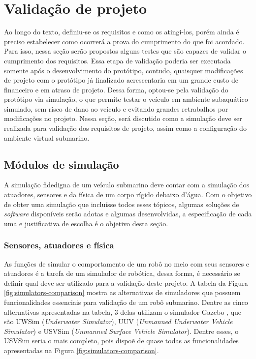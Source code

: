 \section{Validação de projeto}
\label{sec:validacao}

Ao longo do texto, definiu-se os requisitos e como os atingi-los, porém ainda é
preciso estabelecer como ocorrerá a prova do cumprimento do que foi acordado.
Para isso, nessa seção serão propostos alguns testes que são capazes de validar
o cumprimento dos requisitos. Essa etapa de validação poderia ser executada
somente após o desenvolvimento do protótipo, contudo, quaisquer modificações
de projeto com o protótipo já finalizado acrescentaria em um grande custo de
financeiro e em atraso de projeto. Dessa forma, optou-se pela validação do
protótipo via simulação, o que permite testar o veículo em ambiente subaquático
simulado, sem risco de dano ao veículo e evitando grandes retrabalhos por
modificações no projeto. Nessa seção, será discutido como a simulação deve ser
realizada para validação dos requisitos de projeto, assim como a configuração do
ambiente virtual submarino.

\subsection{Módulos de simulação}
\label{sec:simu-modules}

A simulação fidedigna de um veículo submarino deve contar com a simulação dos
atuadores, sensores e da física de um corpo rígido debaixo d'água. Com o objetivo de obter uma simulação que incluísse todos esses tópicos, algumas soluções de \textit{software} disponíveis serão adotas e algumas desenvolvidas, a especificação de cada uma e justificativa de escolha é o objetivo desta seção.

\subsubsection{Sensores, atuadores e física}

As funções de simular o comportamento de um robô no meio com seus sensores e
atuadores é a tarefa de um simulador de robótica, dessa forma, é necessário se
definir qual deve ser utilizado para a validação deste projeto. A tabela da
Figura \ref{fig:simulators-comparison} mostra as alternativas de simuladores
que possuem funcionalidades essenciais para validação de um robô submarino.
Dentre as cinco alternativas apresentadas na tabela, 3 delas utilizam o simulador Gazebo \cite{gazebo}, que são UWSim ({\it Underwater Simulator}), UUV
({\it Unmanned Underwater Vehicle Simulator}) e USVSim ({\it Unmanned Surface
Vehicle Simulator}). Dentre esses, o USVSim seria o mais completo, pois dispoẽ
de quase todas as funcionalidades apresentadas na Figura \ref{fig:simulators-comparison}.

